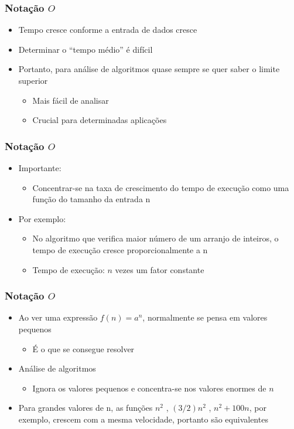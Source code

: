 \documentclass[aspectratio=169]{beamer}
\begin{document}
\begin{frame}\frametitle{Notação $O$}
\begin{itemize}
	\item Tempo cresce conforme a entrada de dados cresce
	\item Determinar o ``tempo médio'' é difícil
	\item Portanto, para análise de algoritmos quase sempre se quer saber o limite superior
	\begin{itemize}
		\item Mais fácil de analisar
		\item Crucial para determinadas aplicações
	\end{itemize}
\end{itemize}
\end{frame}

\begin{frame}\frametitle{Notação $O$}
\begin{itemize}
	\item Importante:
	\begin{itemize}
		\item Concentrar-se na taxa de crescimento do tempo de execução como uma função do tamanho da entrada n
	\end{itemize}
	\item Por exemplo:
	\begin{itemize}
		\item No algoritmo que verifica maior número de um arranjo de inteiros, o tempo de execução cresce proporcionalmente a n
		\item Tempo de execução: $n$ vezes um fator constante
	\end{itemize}
\end{itemize}
\end{frame}

\begin{frame}\frametitle{Notação $O$}
\begin{itemize}
	\item Ao ver uma expressão $f(n) = a^n$, normalmente se pensa em valores pequenos
	\begin{itemize}
		\item É o que se consegue resolver
	\end{itemize}
	\item Análise de algoritmos
	\begin{itemize}
		\item Ignora os valores pequenos e concentra-se nos valores enormes de $n$
	\end{itemize}
	\item Para grandes valores de n, as funções $n^2$ , $(3/2)n^2$ , $n^2+100n$, por exemplo, crescem com a mesma velocidade, portanto são equivalentes
\end{itemize}
\end{frame}
\end{document}
